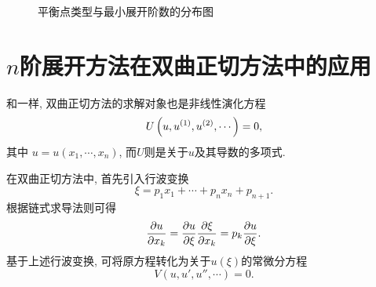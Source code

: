\begin{figure}[htbp]
\centering
{}
\caption{平衡点类型与最小展开阶数的分布图}
\end{figure}

\section{$n$阶展开方法在双曲正切方法中的应用}\label{ch4sec5}
和一样, 双曲正切方法的求解对象也是非线性演化方程
\begin{equation}
    U\left(u,u^{(1)},u^{(2)},\cdots\right)=0,
\end{equation}
其中 $u=u(x_1,\cdots,x_n)$, 而$U$则是关于$u$及其导数的多项式. 

在双曲正切方法中, 首先引入行波变换 
\begin{equation}
    \xi = p_1 x_1 +\cdots + p_n x_n + p_{n+1}.  \label{tanh-tw}
\end{equation}
根据链式求导法则可得
\begin{equation}
    \frac{\partial u}{\partial x_k}=\frac{\partial u}{\partial \xi}\frac{\partial \xi}{\partial x_k}=p_k\frac{\partial u}{\partial \xi}.
\end{equation}
基于上述行波变换, 可将原方程转化为关于$u(\xi)$的常微分方程
\begin{equation}
    V(u,u',u'',\cdots)=0. \label{odeq}
\end{equation}

